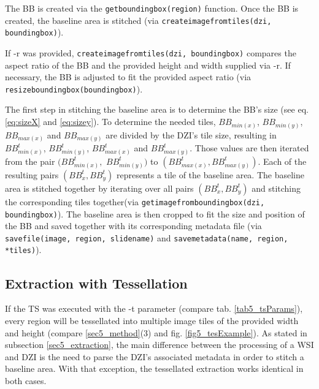 The BB is created via the \texttt{get{\textunderscore}bounding{\textunderscore}box(region)} function. Once the BB is created, the baseline area is stitched (via \texttt{create{\textunderscore}image{\textunderscore}from{\textunderscore}tiles({\allowbreak}dzi, bounding{\textunderscore}box)}). 
\clearpage

If -r was provided, \texttt{create{\textunderscore}image{\textunderscore}from{\textunderscore}tiles({\allowbreak}dzi, bounding{\textunderscore}box)} compares the aspect ratio of the BB and the provided height and width supplied via -r.  If necessary, the BB is adjusted to fit the provided aspect ratio (via \texttt{resize{\textunderscore}bounding{\textunderscore}box(bounding{\textunderscore}box)}).
 
The first step in stitching the baseline area is to determine the BB's size (see eq. \ref{eq:sizeX} and \ref{eq:sizey}). To determine the needed tiles, $BB_{min(x)}$, $BB_{min(y)}$, $BB_{max(x)}$ and $BB_{max(y)}$ are divided by the DZI's tile size, resulting in $BB_{min(x)}^t$, $BB_{min(y)}^t$, $BB_{max(x)}^t$ and $BB_{max(y)}^t$. Those values are then iterated from the pair $(BB_{min(x)}^t,$ $BB_{min(y)}^t)$ to $(BB_{max(x)}^t, BB_{max(y)}^t)$. Each of the resulting pairs $(BB_x^t, BB_y^t)$ represents a tile of the baseline area. The baseline area is stitched together by iterating over all pairs $(BB_x^t, BB_y^t)$ and stitching the corresponding tiles together(via \texttt{get{\textunderscore}image{\textunderscore}from{\textunderscore}bounding{\textunderscore}box(dzi, bounding{\textunderscore}box)}). The baseline area is then cropped to fit the size and position of the BB and saved together with its corresponding metadata file (via \texttt{save{\textunderscore}file(image, region, slide{\textunderscore}name)} and \texttt{save{\textunderscore}metadata(name, region, *tiles)}).


\subsection{Extraction with Tessellation}
\label{sec5_tessellation}
If the TS was executed with the -t parameter (compare tab. \ref{tab5_tsParams}), every region will be tessellated into multiple image tiles of the provided width and height (compare \ref{sec5_method}(3) and fig. \ref{fig5_tesExample}). As stated in subsection \ref{sec5_extraction}, the main difference between the processing of a WSI and DZI is the need to parse the DZI's associated metadata in order to stitch a baseline area. With that exception, the tessellated extraction works identical in both cases.

